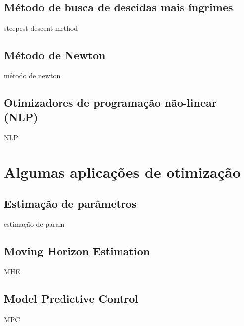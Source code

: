 \subsection{Método de busca de descidas mais íngrimes}

steepest descent method

\subsection{Método de Newton}

método de newton

\subsection{Otimizadores de programação não-linear (NLP)}

NLP

\section{Algumas aplicações de otimização}

\subsection{Estimação de parâmetros}

estimação de param

\subsection{Moving Horizon Estimation}

MHE

\subsection{Model Predictive Control}

MPC